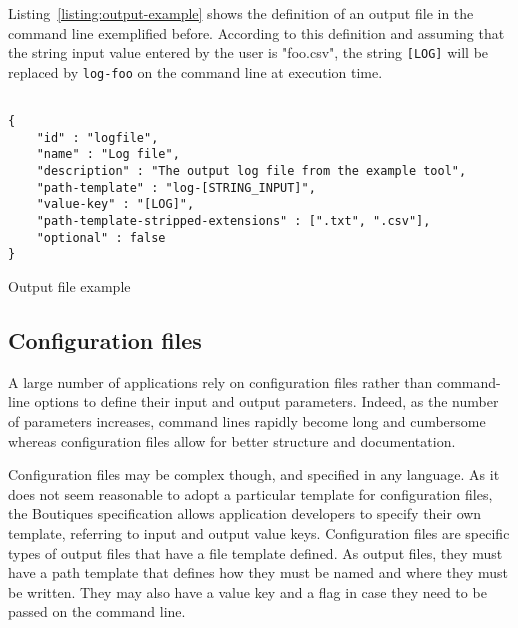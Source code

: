 \documentclass{article}
\begin{document}
Listing~\ref{listing:output-example} shows the definition of an output
file in the command line exemplified before. According to this
definition and assuming that the string input value entered by the
user is "foo.csv", the string \texttt{[LOG]} will be
replaced by \texttt{log-foo} on the command line at execution time.

\begin{listing}
\begin{verbatim}

{
    "id" : "logfile",
    "name" : "Log file",
    "description" : "The output log file from the example tool",
    "path-template" : "log-[STRING_INPUT]",
    "value-key" : "[LOG]",
    "path-template-stripped-extensions" : [".txt", ".csv"],
    "optional" : false
}
\end{verbatim}
\caption{Output file example} 
\label{listing:output-example}
\end{listing}

\subsection{Configuration files}

A large number of applications rely on configuration files rather than
command-line options to define their input and output
parameters. Indeed, as the number of parameters increases, command
lines rapidly become long and cumbersome whereas configuration files
allow for better structure and documentation.

Configuration files may be complex though, and specified in any
language.  As it does not seem reasonable to adopt a particular
template for configuration files, the Boutiques specification allows
application developers to specify their own template, referring to
input and output value keys. Configuration files are specific types of
output files that have a
 file template defined. As output files, 
they must have a path template that defines
how they must be named and where they must be written. They may also
have a value key and a flag in case they need to be passed on the
command line. 
\end{document}
